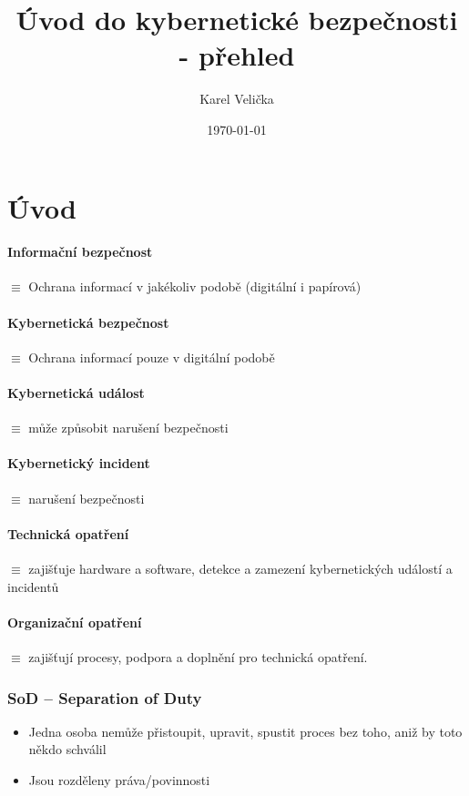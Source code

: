 \documentclass[10pt,a4paper]{article}
\title{Úvod do kybernetické bezpečnosti - přehled}
\date{\today}
\author{\sc Karel Velička}
\begin{document}
\maketitle


\tableofcontents
\newpage



\section{Úvod}

\paragraph*{Informační bezpečnost} $\equiv$ Ochrana informací v jakékoliv podobě (digitální i papírová)
\paragraph*{Kybernetická bezpečnost} $\equiv$ Ochrana informací pouze v digitální podobě
\paragraph*{Kybernetická událost} $\equiv$ může způsobit narušení bezpečnosti
\paragraph*{Kybernetický incident} $\equiv$ narušení bezpečnosti
\paragraph*{Technická opatření} $\equiv$ zajišťuje hardware a software, detekce a zamezení kybernetických událostí a incidentů
\paragraph*{Organizační opatření} $\equiv$ zajišťují procesy, podpora a doplnění pro technická opatření.

\subsubsection*{SoD – Separation of Duty}
\begin{itemize}
    \item Jedna osoba nemůže přistoupit, upravit, spustit proces bez toho, aniž by toto někdo schválil
    \item Jsou rozděleny práva/povinnosti
\end{itemize}
\end{document}
